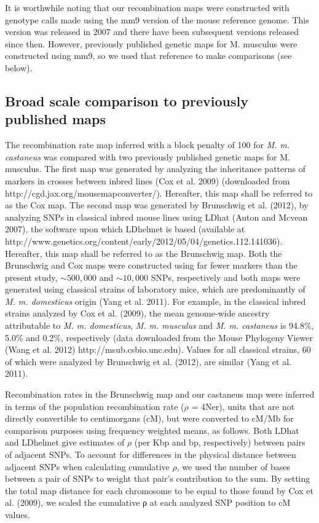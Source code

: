 It is worthwhile noting that our recombination maps were constructed with genotype calls made using the mm9 version of the mouse reference genome. This version was released in 2007 and there have been subsequent versions released since then. However, previously published genetic maps for M. musculus were constructed using mm9, so we used that reference to make comparisons (see below).
 
\subsection{Broad scale comparison to previously published maps}
 
The recombination rate map inferred with a block penalty of 100 for \emph{M. m. castaneus} was compared with two previously published genetic maps for M. musculus. The first map was generated by analyzing the inheritance patterns of markers in crosses between inbred lines (Cox et al. 2009) (downloaded from http://cgd.jax.org/mousemapconverter/). Hereafter, this map shall be referred to as the Cox map. The second map was generated by Brunschwig et al. (2012), by analyzing SNPs in classical inbred mouse lines using LDhat (Auton and Mcvean 2007), the software upon which LDhelmet is based (available at http://www.genetics.org/content/early/2012/05/04/genetics.112.141036). Hereafter, this map shall be referred to as the Brunschwig map. Both the Brunschwig and Cox maps were constructed using far fewer markers than the present study, $\sim500,000$ and $\sim10,000$ SNPs, respectively and both maps were generated using classical strains of laboratory mice, which are predominantly of \emph{M. m. domesticus} origin (Yang et al. 2011). For example, in the classical inbred strains analyzed by Cox et al. (2009), the mean genome-wide ancestry attributable to \emph{M. m. domesticus}, \emph{M. m. musculus} and \emph{M. m. castaneus} is 94.8\%, 5.0\% and 0.2\%, respectively (data downloaded from the Mouse Phylogeny Viewer (Wang et al. 2012) http://msub.csbio.unc.edu). Values for all classical strains, 60 of which were analyzed by Brunschwig et al. (2012), are similar (Yang et al. 2011).

Recombination rates in the Brunschwig map and our castaneus map were inferred in terms of the population recombination rate ($\rho$ = 4Ner), units that are not directly convertible to centimorgans (cM), but were converted to cM/Mb for comparison purposes using frequency weighted means, as follows. Both LDhat and LDhelmet give estimates of $\rho$ (per Kbp and bp, respectively) between pairs of adjacent SNPs. To account for differences in the physical distance between adjacent SNPs when calculating cumulative $\rho$, we used the number of bases between a pair of SNPs to weight that pair’s contribution to the sum. By setting the total map distance for each chromosome to be equal to those found by Cox et al. (2009), we scaled the cumulative ρ at each analyzed SNP position to cM values.
 
